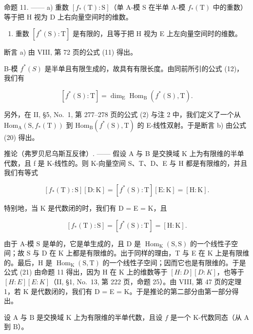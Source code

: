 命题 11. —— a) 重数 \([f_{*}(\mathrm{T}):\mathrm{S}]\)（单 A-模 S 在半单 A-模 \(f_{*}(\mathrm{T})\) 中的重数）等于把 H 视为 D 上右向量空间时的维数。

\begin{enumerate}
\def\labelenumi{\alph{enumi})}
\setcounter{enumi}{1}
\tightlist
\item
  重数 \([f^{*}(\mathrm{S}):\mathrm{T}]\) 是有限的，且等于把 H 视为 E 上左向量空间时的维数。
\end{enumerate}

断言 a) 由 VIII, 第 72 页的公式 (11) 得出。

B-模 \(f^{*}(S)\) 是半单且有限生成的，故具有有限长度。由同前所引的公式 (12)，我们有

\[
[ f ^ {*} (\mathrm{S}): \mathrm{T} ] = \dim_ {\mathrm{E}} \operatorname{Hom} _ {\mathrm{B}} (f ^ {*} (\mathrm{S}), \mathrm{T}).\tag{20}
\]

另外，在 II, §5, No.~1, 第 277--278 页的公式 (2) 与注 2 中，我们定义了一个从 \(\mathrm{Hom}_{\mathrm{A}}(\mathrm{S},f_{*}(\mathrm{T}))\) 到 \(\mathrm{Hom}_{\mathrm{B}}(f^{*}(\mathrm{S}),\mathrm{T})\) 的 E-线性双射。于是断言 b) 由公式 (20) 得出。

推论（弗罗贝尼乌斯互反律）. —— 假设 A 与 B 是交换域 K 上为有限维的半单代数，且 f 是 K-线性的。则 K-向量空间 S、T、D、E 与 H 都是有限维的，并且我们有等式

\[
[ f _ {*} (\mathrm{T}): \mathrm{S} ] [ \mathrm{D}: \mathrm{K} ] = [ f ^ {*} (\mathrm{S}): \mathrm{T} ] [ \mathrm{E}: \mathrm{K} ] = [ \mathrm{H}: \mathrm{K} ].\tag{21}
\]

特别地，当 K 是代数闭的时，我们有 D = E = K，且

\[
[ f _ {*} (\mathrm{T}): \mathrm{S} ] = [ f ^ {*} (\mathrm{S}): \mathrm{T} ] = [ \mathrm{H}: \mathrm{K} ].\tag{22}
\]

由于 A-模 S 是单的，它是单生成的，且 D 是 \(\operatorname{Hom}_{\mathrm{K}}(\mathrm{S},\mathrm{S})\) 的一个线性子空间；故 S 与 D 在 K 上都是有限维的。出于同样的理由，T 与 E 在 K 上是有限维的。最后，H 是 \(\operatorname{Hom}_{\mathrm{K}}(\mathrm{S},\mathrm{T})\) 的一个线性子空间；因而它也是有限维的。于是公式 (21) 由命题 11 得出，因为 H 在 K 上的维数等于 \([H:D][D:K]\)，也等于 \([H:E][E:K]\)（II, §1, No.~13, 第 222 页，命题 25）。由 VIII, 第 47 页的定理 1，若 K 是代数闭的，我们有 D = E = K。于是推论的第二部分由第一部分得出。

设 \(\mathrm{A}\) 与 \(\mathrm{B}\) 是交换域 \(\mathrm{K}\) 上为有限维的半单代数，且设 \(f\) 是一个 \(\mathrm{K}\)-代数同态（从 \(\mathrm{A}\) 到 \(\mathrm{B}\)）。

